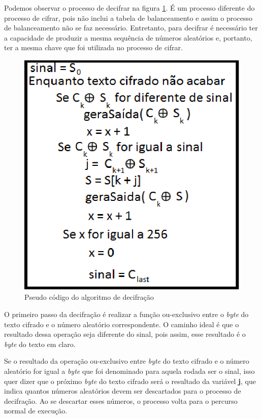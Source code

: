 Podemos observar o processo de decifrar na figura \ref{pseudo-codigo-decifrar}. É um processo diferente do processo de cifrar, pois não inclui a tabela de balanceamento e assim o processo de balanceamento não se faz necessário. Entretanto, para decifrar é necessário ter a capacidade de produzir a mesma sequência de números aleatórios e, portanto, ter a mesma chave que foi utilizada no processo de cifrar. 


\begin{figure}[h]
	\centering
	\includegraphics[scale=1]{figuras/funcionamento_Decifra.eps}
	\caption{Pseudo código do algoritmo de decifração}
	\label{pseudo-codigo-decifrar}
\end{figure}

O primeiro passo da decifração é realizar a função ou-exclusivo entre o \textit{byte} do texto cifrado e o número aleatório correspondente. O caminho ideal é que o resultado dessa operação seja diferente do sinal, pois assim, esse resultado é o \textit{byte} do texto em claro.

Se o resultado da operação ou-exclusivo entre \textit{byte} do texto cifrado e o número aleatório for igual a \textit{byte} que foi denominado para aquela rodada ser o sinal, isso quer dizer que o próximo \textit{byte} do texto cifrado será o resultado da variável \textbf{j}, que indica quantos números aleatórios devem ser descartados para o processo de decifração. Ao se descartar esses números, o processo volta para o percurso normal de execução. 

